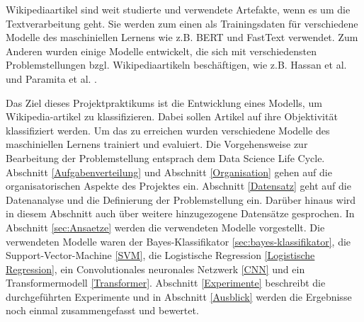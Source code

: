 Wikipediaartikel sind weit studierte und verwendete Artefakte, wenn es um die Textverarbeitung geht. Sie werden zum einen als Trainingsdaten für verschiedene Modelle des maschiniellen Lernens wie z.B. BERT \cite{BERTReference} und FastText \cite{DBLP:journals/corr/BojanowskiGJM16} verwendet. Zum Anderen wurden einige Modelle entwickelt, die sich mit verschiedensten Problemstellungen bzgl. Wikipediaartikeln beschäftigen, wie z.B. Hassan et al. \cite{shavarani2020multiclassmultilingualclassificationwikipedia} und Paramita et al. \cite{das2024languageagnosticmodelingwikipediaarticles}.

Das Ziel dieses Projektpraktikums ist die Entwicklung eines Modells, um Wikipedia-artikel zu klassifizieren. Dabei sollen Artikel auf ihre Objektivität klassifiziert werden. Um das zu erreichen wurden verschiedene Modelle des maschiniellen Lernens trainiert und evaluiert. Die Vorgehensweise zur Bearbeitung der Problemstellung entsprach dem Data Science Life Cycle. Abschnitt \ref{Aufgabenverteilung} und Abschnitt \ref{Organisation} gehen auf die organisatorischen Aspekte des Projektes ein. Abschnitt \ref{Datensatz} geht auf die Datenanalyse und die Definierung der Problemstellung ein. Darüber hinaus wird in diesem Abschnitt auch über weitere hinzugezogene Datensätze gesprochen. In Abschnitt \ref{sec:Ansaetze} werden die verwendeten Modelle vorgestellt. Die verwendeten Modelle waren der Bayes-Klassifikator \ref{sec:bayes-klassifikator}, die Support-Vector-Machine \ref{SVM}, die Logistische Regression \ref{Logistische Regression}, ein Convolutionales neuronales Netzwerk \ref{CNN} und ein Transformermodell \ref{Transformer}. Abschnitt \ref{Experimente} beschreibt die durchgeführten Experimente und in Abschnitt \ref{Ausblick} werden die Ergebnisse noch einmal zusammengefasst und bewertet.

